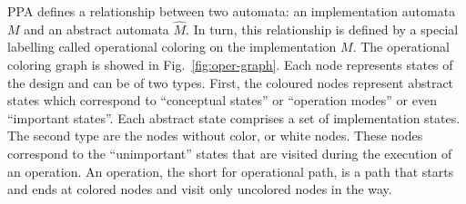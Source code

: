 PPA defines a relationship between two automata: an implementation automata $M$ and an abstract automata $\hat{M}$. In turn, this relationship is defined by a special labelling called operational coloring on the implementation $M$. The operational coloring graph is showed in Fig.~\ref{fig:oper-graph}. Each node represents states of the design and can be of two types. First, the coloured nodes represent abstract states which correspond to “conceptual states” or “operation modes” or even “important states”. Each abstract state comprises a set of implementation states. The second type are the nodes without color, or white nodes. These nodes correspond to the “unimportant” states that are visited during the execution of an operation. An operation, the short for operational path, is a path that starts and ends at colored nodes and visit only uncolored nodes in the way.

